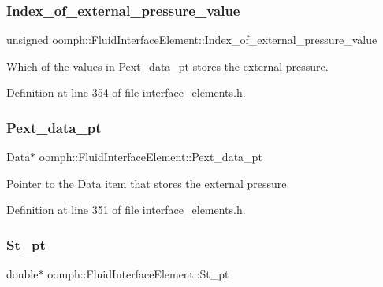 \subsubsection{\texorpdfstring{Index\+\_\+of\+\_\+external\+\_\+pressure\+\_\+value}{Index\_of\_external\_pressure\_value}}
{\footnotesize\ttfamily unsigned oomph\+::\+Fluid\+Interface\+Element\+::\+Index\+\_\+of\+\_\+external\+\_\+pressure\+\_\+value\hspace{0.3cm}{\ttfamily [protected]}}



Which of the values in Pext\+\_\+data\+\_\+pt stores the external pressure. 



Definition at line 354 of file interface\+\_\+elements.\+h.

\mbox{\label{classoomph_1_1FluidInterfaceElement_a9177eb6e96e5ac13fe092596bc104910}} 
\subsubsection{\texorpdfstring{Pext\+\_\+data\+\_\+pt}{Pext\_data\_pt}}
{\footnotesize\ttfamily Data$\ast$ oomph\+::\+Fluid\+Interface\+Element\+::\+Pext\+\_\+data\+\_\+pt\hspace{0.3cm}{\ttfamily [protected]}}



Pointer to the Data item that stores the external pressure. 



Definition at line 351 of file interface\+\_\+elements.\+h.

\mbox{\label{classoomph_1_1FluidInterfaceElement_ae32ade5ea1742938f538e5d5f812bb2a}} 
\subsubsection{\texorpdfstring{St\+\_\+pt}{St\_pt}}
{\footnotesize\ttfamily double$\ast$ oomph\+::\+Fluid\+Interface\+Element\+::\+St\+\_\+pt\hspace{0.3cm}{\ttfamily [private]}}



